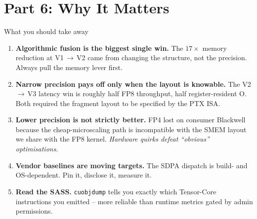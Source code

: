 \documentclass[10pt,aspectratio=169]{beamer}
\begin{document}
{
\begin{frame}[plain]
\end{frame}
}

\section{Part 6: Why It Matters}

\begin{frame}{What you should take away}
  \begin{enumerate}
    \item \textbf{Algorithmic fusion is the biggest single win.} The
          $17\times$ memory reduction at V1\,$\to$\,V2 came from
          changing the structure, not the precision. Always pull the
          memory lever first.
    \item \textbf{Narrow precision pays off only when the layout is
          knowable.} The V2\,$\to$\,V3 latency win is roughly half FP8
          throughput, half register-resident O. Both required the
          fragment layout to be specified by the PTX ISA.
    \item \textbf{Lower precision is not strictly better.} FP4 lost on
          consumer Blackwell because the cheap-microscaling path is
          incompatible with the SMEM layout we share with the FP8
          kernel. \emph{Hardware quirks defeat ``obvious'' optimisations.}
    \item \textbf{Vendor baselines are moving targets.} The SDPA
          dispatch is build- and OS-dependent. Pin it, disclose it,
          measure it.
    \item \textbf{Read the SASS.} \texttt{cuobjdump} tells you exactly
          which Tensor-Core instructions you emitted -- more reliable
          than runtime metrics gated by admin permissions.
  \end{enumerate}
\end{frame}
\end{document}
